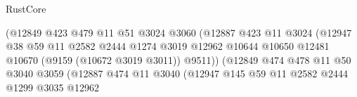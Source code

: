 \begin{lexlean}{RustCore}
\begin{coremodule}
                                              (@12849
                                                @423
                                                @479
                                                @11
                                                @51
                                                @3024
                                                @3060
                                                (@12887
                                                  @423
                                                  @11
                                                  @3024
                                                  (@12947
                                                    @38
                                                    @59
                                                    @11
                                                    @2582
                                                    @2444
                                                    @1274
                                                    @3019
                                                    @12962
                                                    @10644
                                                    @10650
                                                    @12481
                                                    @10670
                                                    (@9159 (@10672 @3019 @3011))
                                                    @9511))
                                                (@12849
                                                  @474
                                                  @478
                                                  @11
                                                  @50
                                                  @3040
                                                  @3059
                                                  (@12887
                                                    @474
                                                    @11
                                                    @3040
                                                    (@12947
                                                      @145
                                                      @59
                                                      @11
                                                      @2582
                                                      @2444
                                                      @1299
                                                      @3035
                                                      @12962

\end{coremodule}
\end{lexlean}
